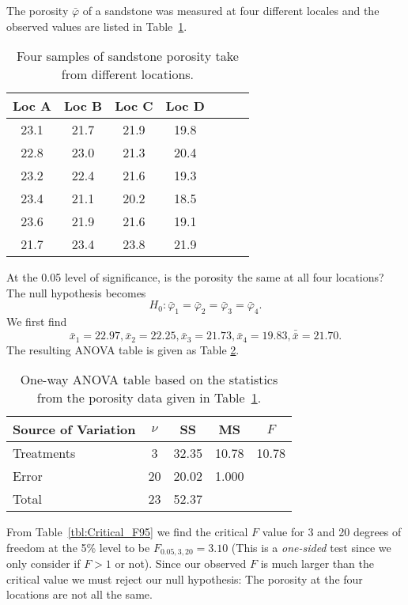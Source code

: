 \begin{example}
The porosity $\bar{\varphi}$ of a sandstone was measured at four different 
locales and the observed values are listed in Table~\ref{tbl:sandstone_data}.
\begin{table}[h]
\center
\begin{tabular}{|c|c|c|c|c|c|c|} \hline
\bf{Loc A} &  \bf{Loc B} & \bf{Loc C} & \bf{Loc D} \\ \hline
23.1 & 21.7 & 21.9 & 19.8 \\ \hline
22.8  & 23.0 & 21.3 & 20.4 \\ \hline
23.2  & 22.4 & 21.6 & 19.3 \\ \hline
23.4 & 21.1 & 20.2 & 18.5 \\ \hline
23.6 & 21.9 & 21.6 & 19.1 \\ \hline
21.7 & 23.4 & 23.8 & 21.9 \\ \hline
\end{tabular}
\caption{Four samples of sandstone porosity take from different locations.}
\label{tbl:sandstone_data}
\end{table}
At the 0.05 level of significance, is the porosity the same at all four locations?  The null 
hypothesis becomes
\begin{equation}
H_0: \bar{\varphi} _1 = \bar{\varphi}_2  = \bar{\varphi}_3 = \bar{\varphi}_4.
\end{equation}	 
We first find
\begin{equation}
\bar{x}_1 = 22.97, \bar{x}_2 = 22.25, \bar{x}_3 = 21.73, \bar{x}_4 = 19.83, \bar{\bar{x}} = 21.70.
\end{equation}
The resulting ANOVA table is given as Table \ref{tbl:sandstone_ANOVA}.
\begin{table}[h]
\center
\begin{tabular}{|l|c|c|c|c|} \hline
\bf{Source of Variation} & $\nu$ & \bf{SS} & \bf{MS} & $F$ \\ \hline	
Treatments & 3 & 32.35 & 10.78 & 10.78  \\ \hline
Error & 20 & 20.02 & 1.000 &   \\ \hline
Total & 23 & 52.37 & &  \\ \hline
\end{tabular}
\caption{One-way ANOVA table based on the statistics from the porosity data given in Table~\ref{tbl:sandstone_data}.}
\label{tbl:sandstone_ANOVA}
\end{table}
From Table~\ref{tbl:Critical_F95} we find the critical $F$ value for 3 and 20 degrees of freedom at the 5\% level to 
be $F_{0.05,3,20} = 3.10$ (This is a \emph{one-sided} test since we only consider if $F > 1$ or not).  Since our 
observed $F$ is much larger than the critical value we must reject our null hypothesis:  The porosity at the four 
locations are not all the same.
\end{example}
